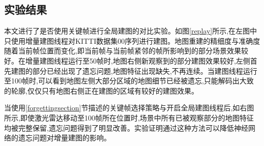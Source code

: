 \subsection{实验结果}
本文进行了是否使用关键帧进行全局建图的对比实验。如图\ref{replay}所示,在左图中只使用增量建图线程对KITTI数据集00序列进行建图。地图重建的精细度与准确度随着当前帧位置而变化,即当前帧与当前帧紧邻的帧所影响到的部分场景效果较好。在增量建图线程运行至50帧时,地图右侧新观察到的部分建图效果较好,左侧首先建图的部分已经出现了遗忘问题,地图特征出现缺失,不再连续。当建图线程运行至100帧时,可以看到地图左侧大部分区域的地图细节已经被遗忘,只能解码出大致的轮廓,仅仅只有地图右侧正在建图的区域有较好的建图效果。

当使用\ref{forgettingsection}节描述的关键帧选择策略与开启全局建图线程后,如右图所示,即使激光雷达移动至100帧所在位置时,场景中所有已被观察部分的地图特征均被完整保留,遗忘问题得到了明显改善。实验证明通过这种方法可以降低神经网络的遗忘问题对增量建图的影响。
